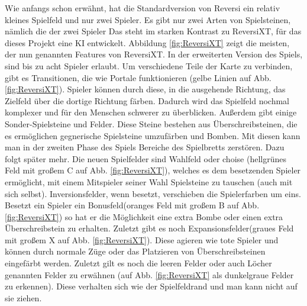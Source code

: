 \documentclass[12pt,a4paper,bibliography=totocnumbered,listof=totocnumbered]{scrartcl}
\begin{document}
    Wie anfangs schon erwähnt, hat die Standardversion von Reversi ein relativ kleines Spielfeld und nur zwei Spieler. Es gibt nur zwei Arten von Spielsteinen, nämlich die der zwei Spieler Das steht im starken Kontrast zu ReversiXT, für das dieses Projekt eine KI entwickelt. Abbildung \ref{fig:ReversiXT} zeigt die meisten, der nun genannten Features von ReversiXT. In der erweiterten Version des Spiels, sind bis zu acht Spieler erlaubt. Um verschiedene Teile der Karte zu verbinden, gibt es Transitionen, die wie \glqq Portale \grqq{} funktionieren (gelbe Linien auf Abb. \ref{fig:ReversiXT}). Spieler können durch diese, in die ausgehende Richtung, das Zielfeld über die dortige Richtung färben. Dadurch wird das Spielfeld nochmal komplexer und für den Menschen schwerer zu überblicken.  Außerdem gibt einige Sonder-Spielsteine und Felder. Diese Steine bestehen aus \glqq Überschreibsteinen\grqq, die es ermöglichen gegnerische Spielsteine umzufärben und \glqq Bomben\grqq. Mit diesen kann man in der zweiten Phase des Spiels Bereiche des Spielbretts zerstören. Dazu folgt später mehr. Die neuen Spielfelder sind \glqq Wahlfeld\grqq{} oder \glqq choise \grqq{} (hellgrünes Feld mit großem C auf Abb. \ref{fig:ReversiXT}), welches es dem besetzenden Spieler ermöglicht, mit einem Mitspieler seiner Wahl Spielsteine zu tauschen (auch mit sich selbst). \glqq Inversionsfelder\grqq, wenn besetzt, verschieben die Spielerfarben um eins. Besetzt ein Spieler ein \glqq Bonusfeld\grqq (oranges Feld mit großem B auf Abb. \ref{fig:ReversiXT}) so hat er die Möglichkeit eine extra Bombe oder einen extra Überschreibstein zu erhalten. Zuletzt gibt es noch \glqq Expansionsfelder\grqq (graues Feld mit großem X auf Abb. \ref{fig:ReversiXT}). Diese agieren wie \glqq tote\grqq{} Spieler und können durch normale Züge oder das Platzieren von Überschreibsteinen eingefärbt werden. Zuletzt gilt es noch die leeren Felder oder auch \glqq Löcher \grqq{} genannten Felder zu erwähnen (auf Abb. \ref{fig:ReversiXT} als dunkelgraue Felder zu erkennen). Diese verhalten sich wie der Spielfeldrand und man kann nicht auf sie ziehen.
    
\end{document}
